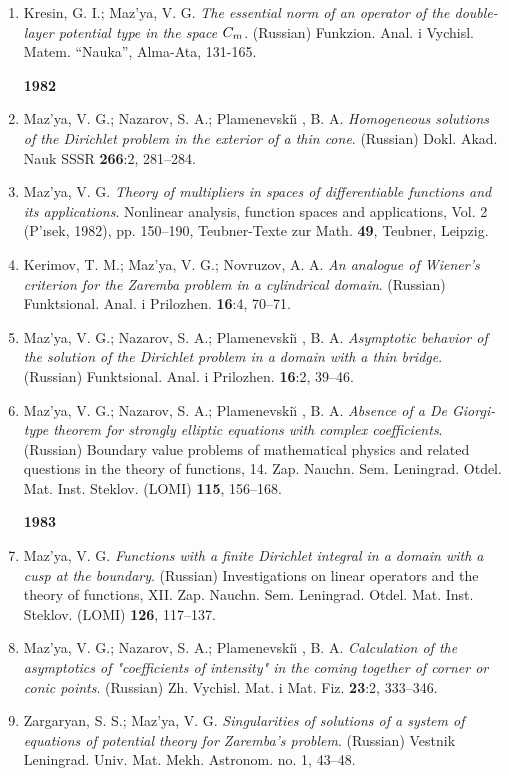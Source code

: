 \documentclass{article}
\begin{document}
\begin{enumerate}
\item Kresin, G. I.; Maz'ya, V. G. {\it The essential norm of an
operator
of the double-layer potential type
in the space $C\sb{m}$}. (Russian) Funkzion. Anal. i Vychisl. Matem.
``Nauka'', Alma-Ata, 131-165.\hfill\break

{\bf 1982}
\item Maz'ya, V. G.; Nazarov, S. A.; Plamenevski{\u\i} , B. A. {\it
Homogeneous solutions of the
Dirichlet problem in the exterior of a thin cone}. (Russian) Dokl.
Akad.
Nauk SSSR {\bf 266}:2, 281--284.
\item Maz'ya, V. G. {\it Theory of multipliers in spaces of
differentiable
functions and its applications}. Nonlinear
analysis, function spaces and applications, Vol. 2 (P'{\i}sek, 1982),
pp.
150--190, Teubner-Texte zur Math. {\bf 49}, Teubner,
Leipzig.
\item Kerimov, T. M.; Maz'ya, V. G.; Novruzov, A. A. {\it An analogue
of
Wiener's criterion for the Zaremba problem
in a cylindrical domain}. (Russian) Funktsional. Anal. i Prilozhen.
{\bf
16}:4, 70--71.
\item Maz'ya, V. G.; Nazarov, S. A.; Plamenevski{\u\i} , B. A. {\it
Asymptotic behavior of the solution of the Dirichlet
problem in a domain with a thin bridge}. (Russian) Funktsional. Anal.
i
Prilozhen. {\bf 16}:2, 39--46.
\item Maz'ya, V. G.; Nazarov, S. A.; Plamenevski{\u\i} , B. A. {\it
Absence
of a De Giorgi-type theorem for
strongly elliptic equations
with complex coefficients}. (Russian) Boundary value problems of
mathematical physics and related questions in the theory of
functions, 14. Zap. Nauchn. Sem. Leningrad. Otdel. Mat. Inst. Steklov.
(LOMI) {\bf 115}, 156--168.\hfill\break

{\bf 1983}
\item Maz'ya, V. G. {\it Functions with a finite Dirichlet integral in
a
domain with a cusp at the boundary}.
(Russian) Investigations on linear operators and the theory of
functions,
XII. Zap. Nauchn. Sem. Leningrad. Otdel. Mat. Inst.
Steklov. (LOMI) {\bf 126}, 117--137.
\item Maz'ya, V. G.; Nazarov, S. A.; Plamenevski{\u\i} , B. A. {\it
Calculation of the asymptotics of "coefficients of intensity"
in the coming together of corner or conic points}. (Russian) Zh.
Vychisl.
Mat. i Mat. Fiz. {\bf 23}:2, 333--346.
\item Zargaryan, S. S.; Maz'ya, V. G. {\it Singularities of solutions
of a
system of equations of potential theory for Zaremba's problem}.
(Russian) Vestnik Leningrad. Univ. Mat. Mekh. Astronom. no. 1, 43--48.


\end{enumerate}
\end{document}
